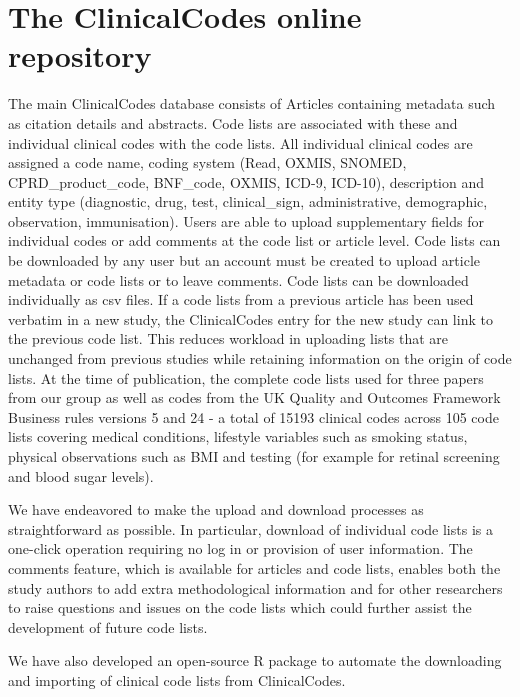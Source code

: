 \documentclass[10pt]{article}
\begin{document}
\section*{The ClinicalCodes online repository}

The main ClinicalCodes database consists of Articles containing metadata such as citation details and abstracts.  Code lists are associated with these and individual clinical codes with the code lists. All individual clinical codes are assigned a code name, coding system (Read, OXMIS, SNOMED, CPRD\_product\_code, BNF\_code, OXMIS, ICD-9, ICD-10), description and entity type (diagnostic, drug, test, clinical\_sign, administrative, demographic, observation, immunisation).  Users are able to upload supplementary fields for individual codes or add comments at the code list or article level.  Code lists can be downloaded by any user but an account must be created to upload article metadata or code lists or to leave comments. Code lists can be downloaded individually as csv files. If a code lists from a previous article has been used verbatim in a new study, the ClinicalCodes entry for the new study can link to the previous code list.  This reduces workload in uploading lists that are unchanged from previous studies while retaining information on the origin of code lists.  At the time of publication, the complete code lists used for three papers from our group \cite{Doran2011, Kontopantelis2014, Reeves2014} as well as codes from the UK Quality and Outcomes Framework Business rules versions 5 and 24 - a total of 15193 clinical codes across 105 code lists covering medical conditions, lifestyle variables such as smoking status, physical observations such as BMI and testing (for example for retinal screening and blood sugar levels).

We have endeavored to make the upload and download processes as straightforward as possible. In particular, download of individual code lists is a one-click operation requiring no log in or provision of user information.  The comments feature, which is available for articles and code lists, enables both the study authors to add extra methodological information and for other researchers to raise questions and issues on the code lists which could further assist the development of future code lists.

We have also developed an open-source R package \cite{Springate2014} to automate the downloading and importing of clinical code lists from ClinicalCodes.

\end{document}
